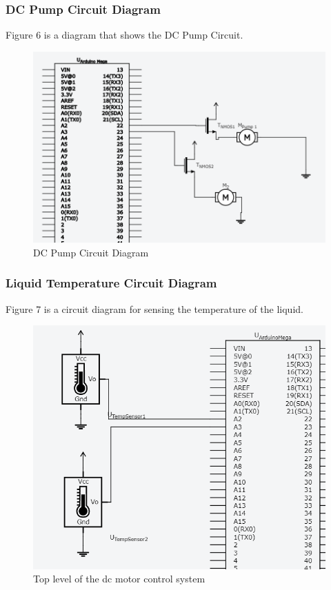 \documentclass [10pt]{article}
\begin{document}

\subsubsection{DC Pump Circuit Diagram}
Figure 6 is a diagram that shows the DC Pump Circuit.
\begin{figure} [h!]
	\centering
	\includegraphics [scale = 0.6] {Figures/Pump.png}
	\caption{DC Pump Circuit Diagram}
\end{figure}


\pagebreak



\subsubsection{Liquid Temperature Circuit Diagram}
Figure 7 is a circuit diagram for sensing the temperature of the liquid.
\begin{figure} [h!]
	\centering
	\includegraphics [scale = 0.6] {Figures/TempSensor.png}
	\caption{Top level of the dc motor control system}
\end{figure}
\end{document}
